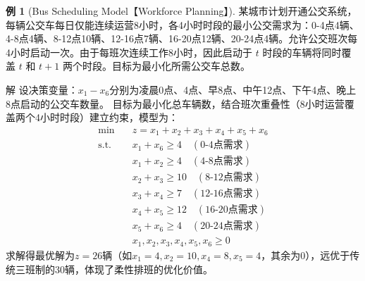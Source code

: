 \documentclass[12pt]{article}
\theoremstyle{plain}
\theoremstyle{definition}
\newtheorem{exm}{例}[subsection]
\newenvironment{slv}[1][解]{\begin{paragraph}{#1}\mbox{}}{\end{paragraph}\par\nopagebreak}
\newcommand{\st}{\mathrel{\text{s.t.}}}
\begin{document}
\begin{exm}[Bus Scheduling Model【Workforce Planning】]
    某城市计划开通公交系统，每辆公交车每日仅能连续运营8小时，各4小时时段的最小公交需求为：0-4点4辆、4-8点4辆、8-12点10辆、12-16点7辆、16-20点12辆、20-24点4辆。允许公交班次每4小时启动一次。由于每班次连续工作8小时，因此启动于 $t$ 时段的车辆将同时覆盖 $t$ 和 $t+1$ 两个时段。目标为最小化所需公交车总数。

    \begin{slv}
    设决策变量：$x_1-x_6$分别为凌晨0点、4点、早8点、中午12点、下午4点、晚上8点启动的公交车数量。
    目标为最小化总车辆数，结合班次重叠性（8小时运营覆盖两个4小时时段）建立约束，模型为：
    \begin{align*}
        \min \quad & z=x_1+x_2+x_3+x_4+x_5+x_6 \\
        \st \quad & x_1+x_6 \geq 4 \quad (\text{0-4点需求}) \\
        & x_1+x_2 \geq 4 \quad (\text{4-8点需求}) \\
        & x_2+x_3 \geq 10 \quad (\text{8-12点需求}) \\
        & x_3+x_4 \geq 7 \quad (\text{12-16点需求}) \\
        & x_4+x_5 \geq 12 \quad (\text{16-20点需求}) \\
        & x_5+x_6 \geq 4 \quad (\text{20-24点需求}) \\
        & x_1,x_2,x_3,x_4,x_5,x_6 \geq 0
    \end{align*}
    求解得最优解为$z=26$辆（如$x_1=4,x_2=10,x_4=8,x_5=4$，其余为0），远优于传统三班制的30辆，体现了柔性排班的优化价值。
    \end{slv}
\end{exm}
\end{document}
